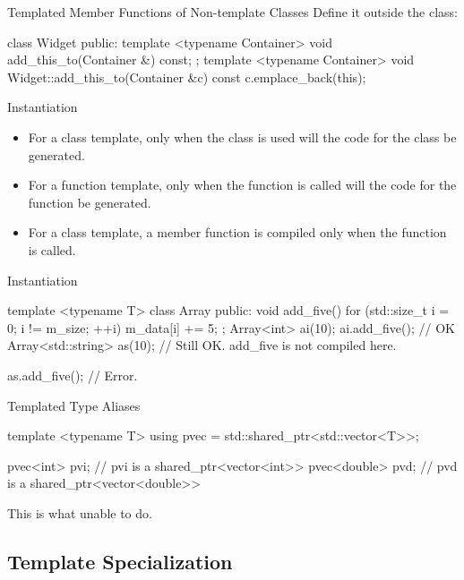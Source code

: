 \begin{frame}[fragile]{Templated Member Functions of Non-template Classes}
    Define it outside the class:
    \begin{cpp}
class Widget {
 public:
  template <typename Container>
  void add_this_to(Container &) const;
};
template <typename Container>
void Widget::add_this_to(Container &c) const {
  c.emplace_back(this);
}
    \end{cpp}
\end{frame}

\begin{frame}[fragile]{Instantiation}
    \begin{itemize}
        \item For a class template, only when the class is used will the code for the class be generated.
        \item For a function template, only when the function is called will the code for the function be generated.
        \pause
        \item For a class template, a member function is compiled only when the function is called.
    \end{itemize}
\end{frame}

\begin{frame}[fragile]{Instantiation}
    \begin{cpp}
template <typename T>
class Array {
 public:
  void add_five() {
    for (std::size_t i = 0; i != m_size; ++i)
      m_data[i] += 5;
  }
};
Array<int> ai(10);
ai.add_five();              // OK
Array<std::string> as(10);
// Still OK. add_five is not compiled here.
    \end{cpp}
    \pause
    \begin{cpp}
as.add_five(); // Error.
    \end{cpp}
\end{frame}

\begin{frame}[fragile]{Templated Type Aliases}
    \begin{cpp}
template <typename T>
using pvec = std::shared_ptr<std::vector<T>>;

pvec<int> pvi; // pvi is a shared_ptr<vector<int>>
pvec<double> pvd; // pvd is a shared_ptr<vector<double>>
    \end{cpp}
    This is what  unable to do.
\end{frame}

\subsection{Template Specialization}

